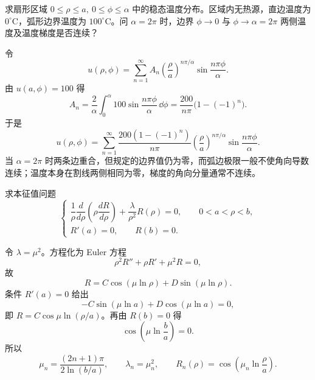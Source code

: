 \begin{question}
求扇形区域 \(0\le\rho\le a,\ 0\le\phi\le\alpha\) 中的稳态温度分布。区域内无热源，直边温度为 \(0^\circ\mathrm C\)，弧形边界温度为 \(100^\circ\mathrm C\)。问 \(\alpha=2\pi\) 时，边界 \(\phi\to0\) 与 \(\phi\to\alpha=2\pi\) 两侧温度及温度梯度是否连续？
\begin{solution}
令
\[
u(\rho,\phi)=\sum_{n=1}^{\infty}A_n
\left(\frac{\rho}{a}\right)^{n\pi/\alpha}
\sin\frac{n\pi\phi}{\alpha}.
\]
由 \(u(a,\phi)=100\) 得
\[
A_n=\frac{2}{\alpha}\int_0^\alpha100\sin\frac{n\pi\phi}{\alpha}\,\dd{\phi}
=\frac{200}{n\pi}\bigl(1-(-1)^n\bigr).
\]
于是
\[
u(\rho,\phi)=\sum_{n=1}^{\infty}
\frac{200(1-(-1)^n)}{n\pi}
\left(\frac{\rho}{a}\right)^{n\pi/\alpha}
\sin\frac{n\pi\phi}{\alpha}.
\]
当 \(\alpha=2\pi\) 时两条边重合，但规定的边界值仍为零，而弧边极限一般不使角向导数连续；温度本身在割线两侧相同为零，梯度的角向分量通常不连续。
\end{solution}
\end{question}

\begin{question}
求本征值问题
\[
\begin{cases}
\dfrac1\rho\dfrac d{d\rho}\left(\rho\dfrac{dR}{d\rho}\right)+\dfrac{\lambda}{\rho^2}R(\rho)=0,\qquad 0<a<\rho<b,\\
R'(a)=0,\qquad R(b)=0.
\end{cases}
\]
\begin{solution}
令 \(\lambda=\mu^2\)。方程化为 Euler 方程
\[
\rho^2R''+\rho R'+\mu^2R=0,
\]
故
\[
R=C\cos(\mu\ln\rho)+D\sin(\mu\ln\rho).
\]
条件 \(R'(a)=0\) 给出
\[
-C\sin(\mu\ln a)+D\cos(\mu\ln a)=0,
\]
即 \(R=C\cos\mu\ln(\rho/a)\)。再由 \(R(b)=0\) 得
\[
\cos\left(\mu\ln\frac ba\right)=0.
\]
所以
\[
\mu_n=\frac{(2n+1)\pi}{2\ln(b/a)},\qquad
\lambda_n=\mu_n^2,\qquad
R_n(\rho)=\cos\left(\mu_n\ln\frac{\rho}{a}\right).
\]
\end{solution}
\end{question}

